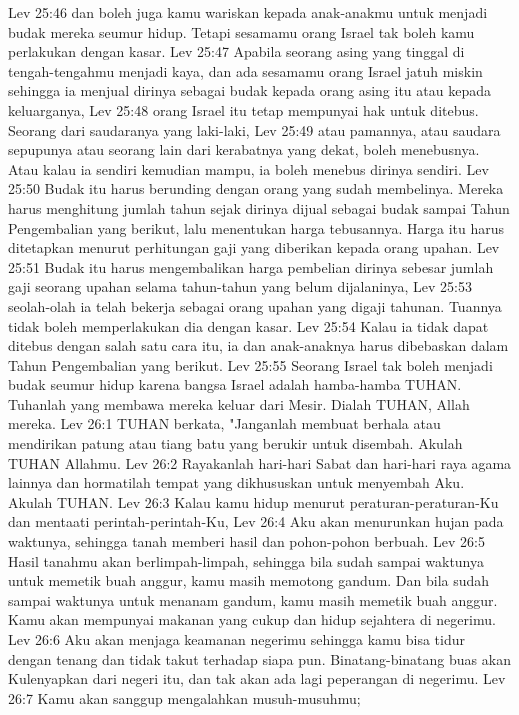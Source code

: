 Lev 25:46  dan boleh juga kamu wariskan kepada anak-anakmu untuk menjadi budak mereka seumur hidup. Tetapi sesamamu orang Israel tak boleh kamu perlakukan dengan kasar.
Lev 25:47  Apabila seorang asing yang tinggal di tengah-tengahmu menjadi kaya, dan ada sesamamu orang Israel jatuh miskin sehingga ia menjual dirinya sebagai budak kepada orang asing itu atau kepada keluarganya,
Lev 25:48  orang Israel itu tetap mempunyai hak untuk ditebus. Seorang dari saudaranya yang laki-laki,
Lev 25:49  atau pamannya, atau saudara sepupunya atau seorang lain dari kerabatnya yang dekat, boleh menebusnya. Atau kalau ia sendiri kemudian mampu, ia boleh menebus dirinya sendiri.
Lev 25:50  Budak itu harus berunding dengan orang yang sudah membelinya. Mereka harus menghitung jumlah tahun sejak dirinya dijual sebagai budak sampai Tahun Pengembalian yang berikut, lalu menentukan harga tebusannya. Harga itu harus ditetapkan menurut perhitungan gaji yang diberikan kepada orang upahan.
Lev 25:51  Budak itu harus mengembalikan harga pembelian dirinya sebesar jumlah gaji seorang upahan selama tahun-tahun yang belum dijalaninya,
Lev 25:53  seolah-olah ia telah bekerja sebagai orang upahan yang digaji tahunan. Tuannya tidak boleh memperlakukan dia dengan kasar.
Lev 25:54  Kalau ia tidak dapat ditebus dengan salah satu cara itu, ia dan anak-anaknya harus dibebaskan dalam Tahun Pengembalian yang berikut.
Lev 25:55  Seorang Israel tak boleh menjadi budak seumur hidup karena bangsa Israel adalah hamba-hamba TUHAN. Tuhanlah yang membawa mereka keluar dari Mesir. Dialah TUHAN, Allah mereka.
Lev 26:1  TUHAN berkata, "Janganlah membuat berhala atau mendirikan patung atau tiang batu yang berukir untuk disembah. Akulah TUHAN Allahmu.
Lev 26:2  Rayakanlah hari-hari Sabat dan hari-hari raya agama lainnya dan hormatilah tempat yang dikhususkan untuk menyembah Aku. Akulah TUHAN.
Lev 26:3  Kalau kamu hidup menurut peraturan-peraturan-Ku dan mentaati perintah-perintah-Ku,
Lev 26:4  Aku akan menurunkan hujan pada waktunya, sehingga tanah memberi hasil dan pohon-pohon berbuah.
Lev 26:5  Hasil tanahmu akan berlimpah-limpah, sehingga bila sudah sampai waktunya untuk memetik buah anggur, kamu masih memotong gandum. Dan bila sudah sampai waktunya untuk menanam gandum, kamu masih memetik buah anggur. Kamu akan mempunyai makanan yang cukup dan hidup sejahtera di negerimu.
Lev 26:6  Aku akan menjaga keamanan negerimu sehingga kamu bisa tidur dengan tenang dan tidak takut terhadap siapa pun. Binatang-binatang buas akan Kulenyapkan dari negeri itu, dan tak akan ada lagi peperangan di negerimu.
Lev 26:7  Kamu akan sanggup mengalahkan musuh-musuhmu;
